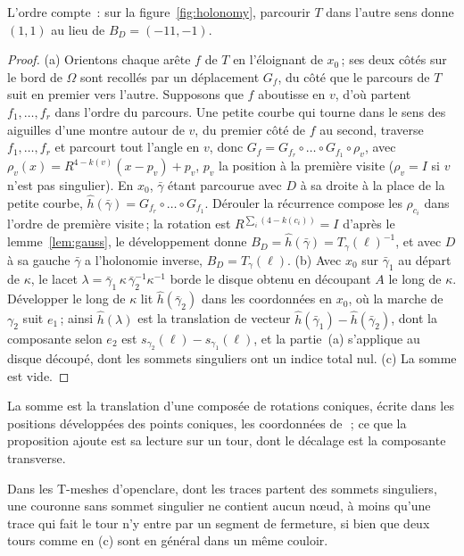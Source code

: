 \documentclass[11pt,a4paper]{article}
\newcommand{\shift}{s}
\begin{document}
L'ordre compte~: sur la figure~\ref{fig:holonomy}, parcourir $T$ dans l'autre
sens donne $(1, 1)$ au lieu de $B_D = (-11, -1)$.

\begin{proof}
(a) Orientons chaque arête $f$ de $T$ en l'éloignant de $x_0$\,; ses deux
côtés sur le bord de $\Omega$ sont recollés par un déplacement $G_f$, du côté
que le parcours de $T$ suit en premier vers l'autre. Supposons que $f$
aboutisse en $v$, d'où partent $f_1, \dots, f_r$ dans l'ordre du parcours. Une
petite courbe qui tourne dans le sens des aiguilles d'une montre autour de
$v$, du premier côté de $f$ au second, traverse $f_1, \dots, f_r$ et parcourt
tout l'angle en $v$, donc $G_f = G_{f_r} \circ \dots \circ G_{f_1} \circ
\rho_v$, avec $\rho_v(x) = R^{4-k(v)}(x - p_v) + p_v$, $p_v$ la position à la
première visite ($\rho_v = I$ si $v$ n'est pas singulier). En $x_0$,
$\bar\gamma$ étant parcourue avec $D$ à sa droite à la place de la petite
courbe, $\hat h(\bar\gamma) = G_{f_r} \circ \dots \circ G_{f_1}$. Dérouler la
récurrence compose les $\rho_{c_i}$ dans l'ordre de première visite\,; la
rotation est $R^{\sum_i(4 - k(c_i))} = I$ d'après le lemme~\ref{lem:gauss},
le développement donne $B_D = \hat h(\bar\gamma) = T_\gamma(\ell)^{-1}$, et
avec $D$ à sa gauche $\bar\gamma$ a l'holonomie inverse, $B_D =
T_\gamma(\ell)$. (b) Avec $x_0$ sur $\bar\gamma_1$ au départ de $\kappa$,
le lacet $\lambda = \bar\gamma_1\, \kappa\, \bar\gamma_2^{-1} \kappa^{-1}$
borde le disque obtenu en découpant $A$ le long de $\kappa$. Développer le
long de $\kappa$ lit $\hat h(\bar\gamma_2)$ dans les coordonnées en $x_0$, où
la marche de $\gamma_2$ suit $e_1$\,; ainsi $\hat h(\lambda)$ est la
translation de vecteur $\hat h(\bar\gamma_1) - \hat h(\bar\gamma_2)$, dont
la composante selon $e_2$ est $\shift_{\gamma_2}(\ell) - \shift_{\gamma_1}(\ell)$,
et la partie~(a) s'applique au disque découpé, dont les sommets singuliers ont un
indice total nul. (c) La somme est vide.
\end{proof}

La somme est la translation d'une composée de rotations coniques, écrite dans
les positions développées des points coniques, les coordonnées
de~\cite{thurston1998shapes}\,; ce que la proposition ajoute est sa lecture
sur un tour, dont le décalage est la composante transverse.

Dans les T-meshes d'openclare, dont les traces partent des sommets
singuliers, une couronne sans sommet singulier ne contient aucun nœud, à moins
qu'une trace qui fait le tour n'y entre par un segment de fermeture, si bien
que deux tours comme en (c) sont en général dans un même couloir.
\end{document}
